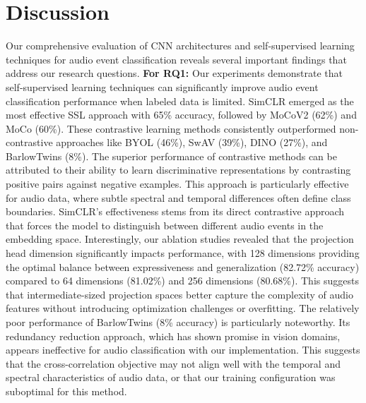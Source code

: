 \documentclass[11pt]{article}
\begin{document}
\section*{Discussion}
Our comprehensive evaluation of CNN architectures and self-supervised learning techniques for audio event classification reveals several important findings that address our research questions. 
\textbf{For RQ1:} Our experiments demonstrate that self-supervised learning techniques can significantly improve audio event classification performance when labeled data is limited. SimCLR emerged as the most effective SSL approach with 65\% accuracy, followed by MoCoV2 (62\%) and MoCo (60\%). These contrastive learning methods consistently outperformed non-contrastive approaches like BYOL (46\%), SwAV (39\%), DINO (27\%), and BarlowTwins (8\%). The superior performance of contrastive methods can be attributed to their ability to learn discriminative representations by contrasting positive pairs against negative examples. This approach is particularly effective for audio data, where subtle spectral and temporal differences often define class boundaries. SimCLR's effectiveness stems from its direct contrastive approach that forces the model to distinguish between different audio events in the embedding space. Interestingly, our ablation studies revealed that the projection head dimension significantly impacts performance, with 128 dimensions providing the optimal balance between expressiveness and generalization (82.72\% accuracy) compared to 64 dimensions (81.02\%) and 256 dimensions (80.68\%). This suggests that intermediate-sized projection spaces better capture the complexity of audio features without introducing optimization challenges or overfitting. The relatively poor performance of BarlowTwins (8\% accuracy) is particularly noteworthy. Its redundancy reduction approach, which has shown promise in vision domains, appears ineffective for audio classification with our implementation. This suggests that the cross-correlation objective may not align well with the temporal and spectral characteristics of audio data, or that our training configuration was suboptimal for this method.
\end{document}
